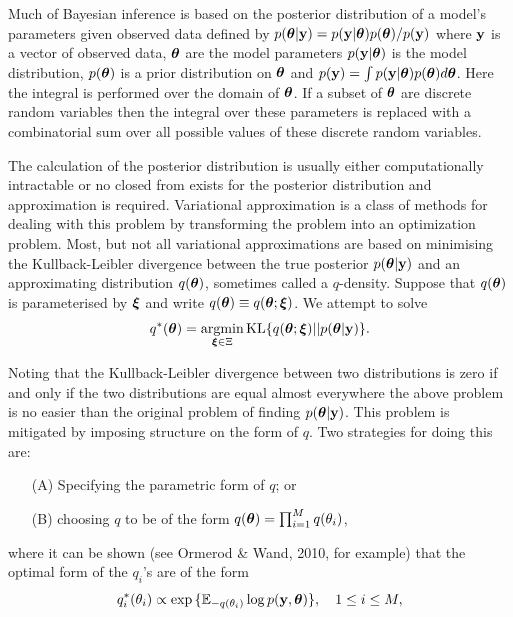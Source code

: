 \documentclass{amsart}[12pt]
\begin{document}
Much of Bayesian inference is based on the posterior distribution of a model's parameters given observed data 
defined by $p({\boldsymbol \theta}|{\bf y}) = p({\bf y}|{\boldsymbol \theta})p({\boldsymbol \theta})/p({\bf y})$ where ${\bf y}$ is a vector of observed data,
${\boldsymbol \theta}$ are the model parameters $p({\bf y}|{\boldsymbol \theta})$ is the model distribution, $p({\boldsymbol \theta})$ is a prior 
distribution on ${\boldsymbol \theta}$ and $p({\bf y})=\int p({\bf y}|{\boldsymbol \theta})p({\boldsymbol \theta})d{\boldsymbol \theta}$. Here the integral is performed
over the domain of ${\boldsymbol \theta}$. If a subset of ${\boldsymbol \theta}$ are discrete random variables then the integral over
these parameters is replaced with a combinatorial sum over all possible values of these discrete random 
variables.

\noindent The calculation of the posterior distribution is usually either computationally intractable or no
closed from exists for the posterior distribution and approximation is required. Variational approximation is
a  class of methods for dealing with this problem by transforming the problem into an optimization problem.
Most, but not all variational approximations are based on minimising the Kullback-Leibler divergence between
the true posterior $p({\boldsymbol \theta}|{\bf y})$ and an approximating distribution $q({\boldsymbol \theta})$, sometimes called a
$q$-density. Suppose that $q({\boldsymbol \theta})$ is parameterised by ${\boldsymbol \xi}$ and write $q({\boldsymbol \theta})\equiv
q({\boldsymbol \theta};{\boldsymbol \xi})$. We attempt to solve
$$
\ds q^*(\vtheta) = \argmin_{\vxi \in \Xi} \text{KL} \{ {q(\vtheta;\vxi) || p(\vtheta|\vy)} \}.
$$

\noindent Noting that the Kullback-Leibler divergence between two distributions is zero if and only if
the two distributions are equal almost everywhere the above problem is no easier than the original problem
of finding $p({\boldsymbol \theta}|{\bf y})$. This problem is mitigated by imposing structure on the form of $q$. Two
strategies for doing this are:
\begin{enumerate}
	\item[(A)] Specifying the parametric form of $q$; or 
	\item[(B)] choosing $q$ to be of the form $q({\boldsymbol \theta}) = \prod_{i=1}^M q(\theta_i)$,
\end{enumerate}

\noindent where it can be shown (see Ormerod \& Wand, 2010, for example) that the optimal form of the
$q_i$'s are of the form
\begin{equation}\label{eq:consistency}
	q_i^*(\theta_i) \propto \exp{\{ {\mathbb E}_{-q(\theta_i)} \log p({\bf y}, {\boldsymbol\theta}) \}},  \quad 1\le i\le M,
\end{equation}
\end{document}
